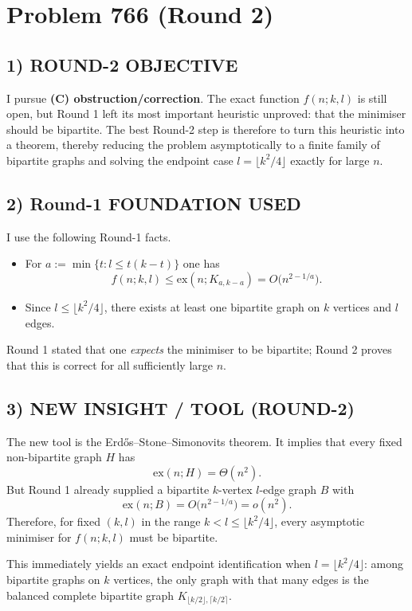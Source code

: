 \section*{Problem 766 (Round 2)}

\subsection*{1) ROUND-2 OBJECTIVE}
I pursue \textbf{(C) obstruction/correction}. The exact function $f(n;k,l)$ is still open, but Round 1 left its most important heuristic unproved: that the minimiser should be bipartite. The best Round-2 step is therefore to turn this heuristic into a theorem, thereby reducing the problem asymptotically to a finite family of bipartite graphs and solving the endpoint case $l=\lfloor k^2/4\rfloor$ exactly for large $n$.

\subsection*{2) Round-1 FOUNDATION USED}
I use the following Round-1 facts.
\begin{itemize}
\item For $a:=\min\{t: l\le t(k-t)\}$ one has
\[
f(n;k,l)\le \mathrm{ex}(n;K_{a,k-a})=O\bigl(n^{2-1/a}\bigr).
\]
\item Since $l\le \lfloor k^2/4\rfloor$, there exists at least one bipartite graph on $k$ vertices and $l$ edges.
\end{itemize}
Round 1 stated that one \emph{expects} the minimiser to be bipartite; Round 2 proves that this is correct for all sufficiently large $n$.

\subsection*{3) NEW INSIGHT / TOOL (ROUND-2)}
The new tool is the Erd\H{o}s--Stone--Simonovits theorem. It implies that every fixed non-bipartite graph $H$ has
\[
\mathrm{ex}(n;H)=\Theta(n^2).
\]
But Round 1 already supplied a bipartite $k$-vertex $l$-edge graph $B$ with
\[
\mathrm{ex}(n;B)=O\bigl(n^{2-1/a}\bigr)=o(n^2).
\]
Therefore, for fixed $(k,l)$ in the range $k<l\le \lfloor k^2/4\rfloor$, every asymptotic minimiser for $f(n;k,l)$ must be bipartite.

This immediately yields an exact endpoint identification when $l=\lfloor k^2/4\rfloor$: among bipartite graphs on $k$ vertices, the only graph with that many edges is the balanced complete bipartite graph $K_{\lfloor k/2\rfloor,\lceil k/2\rceil}$.

